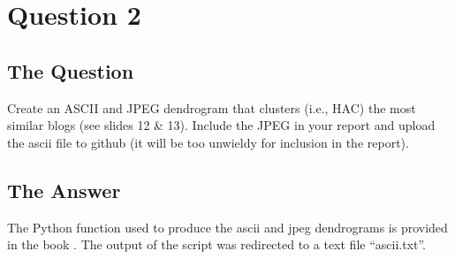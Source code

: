 \section{Question 2}

\subsection{The Question}

\begin{flushleft}

Create an ASCII and JPEG dendrogram that clusters (i.e., HAC)
the most similar blogs (see slides 12 \& 13).  Include the JPEG in
your report and upload the ascii file to github (it will be too
unwieldy for inclusion in the report).

\end{flushleft}
\subsection{The Answer}

The Python function used to produce the ascii and jpeg dendrograms is provided in the book \cite{PCI}. The output of the script was redirected to a text file ``ascii.txt''. 



